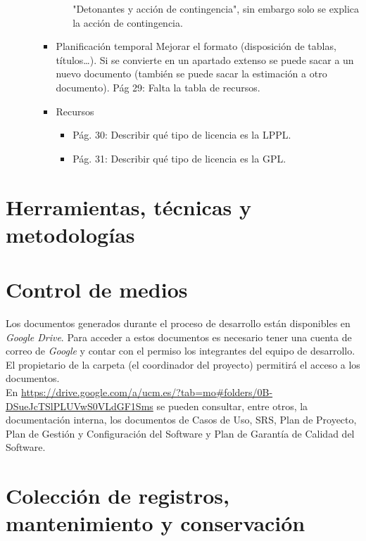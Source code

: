 \documentclass[11pt, a4paper, twoside, titlepage]{article}
\begin{document}
\begin{itemize}
\begin{itemize}
\begin{itemize}
\begin{itemize}
"Detonantes  y  acción  de  contingencia",  sin  embargo  solo  se  explica  la   acción  de  contingencia.
								\end{itemize}  
							\item Planificación temporal
								Mejorar  el  formato  (disposición  de  tablas,  títulos…).  Si  se  convierte   en  un  apartado  extenso  se  puede  sacar  a  un  nuevo  documento   (también  se  puede  sacar  la  estimación  a  otro  documento).   Pág  29:  Falta  la  tabla  de  recursos.    
							\item Recursos
								\begin{itemize}
								\item Pág.  30:  Describir  qué  tipo  de  licencia  es  la  LPPL.   
								\item Pág.  31:  Describir  qué  tipo  de  licencia  es  la  GPL.  
								\end{itemize}
						\end{itemize}
				\end{itemize}
		\end{itemize}	
	\section{Herramientas, técnicas y metodologías}%
	\section{Control de medios}%
		Los documentos generados durante el proceso de desarrollo están disponibles en \textit{Google Drive}. Para acceder a estos documentos es necesario tener una cuenta de correo de \textit{Google} y contar con el permiso los integrantes del equipo de desarrollo. El propietario de la carpeta (el coordinador del proyecto) permitirá el acceso a los documentos. \\
		En \url{https://drive.google.com/a/ucm.es/?tab=mo#folders/0B-DSueJcTSlPLUVwS0VLdGF1Sms} se pueden consultar, entre otros, la documentación interna, los documentos de Casos de Uso, SRS, Plan de Proyecto, Plan de Gestión y Configuración del Software y Plan de Garantía de Calidad del Software.

	\section{Colección de registros, mantenimiento y conservación}%
\end{document}
